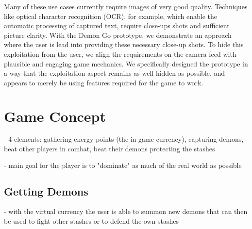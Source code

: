 Many of these use cases currently require images of very good quality.
Techniques like optical character recognition (OCR), for example, which enable the automatic processing of captured text, require close-ups shots and sufficient picture clarity.
With the Demon Go prototype, we demonstrate an approach where the user is lead into providing these necessary close-up shots.
To hide this exploitation from the user, we align the requirements on the camera feed with plausible and engaging game mechanics.
We specifically designed the prototype in a way that the exploitation aspect remains as well hidden as possible, and appears to merely be using features required for the game to work.

\section{Game Concept}
\label{sec:concept}

- 4 elements: gathering energy points (the in-game currency), capturing demons, beat other players in combat, beat their demons protecting the stashes

- main goal for the player is to "dominate" as much of the real world as possible



\subsection{Getting Demons}
\label{subsec:demons}

- with the virtual currency the user is able to summon new demons that can then be used to fight other stashes or to defend the own stashes

